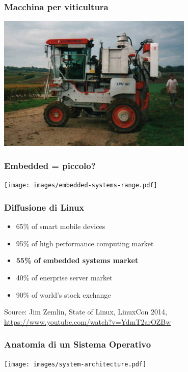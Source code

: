 \documentclass[xetex,table]{beamer}
\begin{document}
\begin{frame}
\frametitle{Macchina per viticultura}
  \begin{center}
    \includegraphics[width=0.7\textwidth]{images/viticulture-machine.jpg}
  \end{center}
\end{frame}

\begin{frame}
\frametitle{Embedded = piccolo?}
  \begin{center}
    \texttt{[image: images/embedded-systems-range.pdf]}
  \end{center}
\end{frame}

\begin{frame}
\frametitle{Diffusione di Linux}
  \begin{itemize}
    \item 65\% of smart mobile devices
    \item 95\% of high performance computing market
    \item \textbf{55\% of embedded systems market}
    \item 40\% of enerprise server market
    \item 90\% of world’s stock exchange
  \end{itemize}
  {\tiny Source: Jim Zemlin, State of Linux, LinuxCon 2014,
    \url{https://www.youtube.com/watch?v=YdmT2arOZBw}}
\end{frame}

\begin{frame}
\frametitle{Anatomia di un Sistema Operativo}
  \begin{center}
    \texttt{[image: images/system-architecture.pdf]}
  \end{center}
\end{frame}
\end{document}

